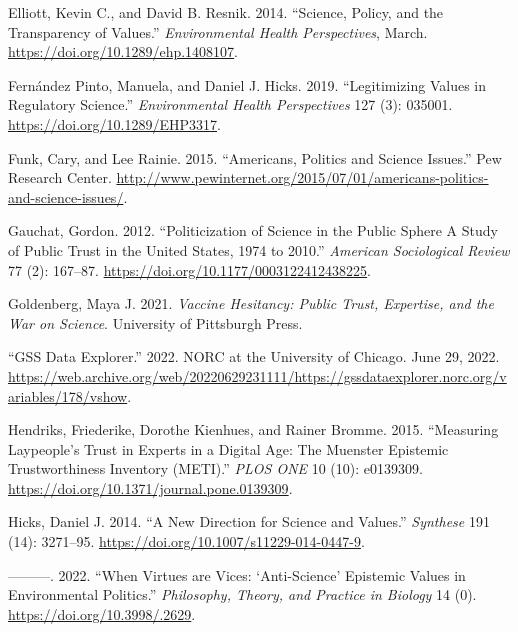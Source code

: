 \documentclass[
  letterpaper,
  DIV=11,
  numbers=noendperiod]{scrartcl}
\newlength{\cslhangindent}
\newlength{\cslentryspacingunit} %
\newenvironment{CSLReferences}[2] %
 {%
  \setlength{\parindent}{0pt}
  \ifodd #1
  \let\oldpar\par
  \def\par{\hangindent=\cslhangindent\oldpar}
  \fi
  \setlength{\parskip}{#2\cslentryspacingunit}
 }%
 {}
\begin{document}
\begin{CSLReferences}{1}{0}
\leavevmode{}%
Elliott, Kevin C., and David B. Resnik. 2014. {``Science, Policy, and
the Transparency of Values.''} \emph{Environmental Health Perspectives},
March. \url{https://doi.org/10.1289/ehp.1408107}.

\leavevmode{}%
Fernández Pinto, Manuela, and Daniel J. Hicks. 2019. {``Legitimizing
Values in Regulatory Science.''} \emph{Environmental Health
Perspectives} 127 (3): 035001. \url{https://doi.org/10.1289/EHP3317}.

\leavevmode{}%
Funk, Cary, and Lee Rainie. 2015. {``Americans, Politics and Science
Issues.''} Pew Research Center.
\url{http://www.pewinternet.org/2015/07/01/americans-politics-and-science-issues/}.

\leavevmode{}%
Gauchat, Gordon. 2012. {``Politicization of Science in the Public Sphere
A Study of Public Trust in the United States, 1974 to 2010.''}
\emph{American Sociological Review} 77 (2): 167--87.
\url{https://doi.org/10.1177/0003122412438225}.

\leavevmode{}%
Goldenberg, Maya J. 2021. \emph{Vaccine Hesitancy: Public Trust,
Expertise, and the War on Science}. University of Pittsburgh Press.

\leavevmode{}%
{``GSS Data Explorer.''} 2022. NORC at the University of Chicago. June
29, 2022.
\url{https://web.archive.org/web/20220629231111/https://gssdataexplorer.norc.org/variables/178/vshow}.

\leavevmode{}%
Hendriks, Friederike, Dorothe Kienhues, and Rainer Bromme. 2015.
{``Measuring Laypeople's Trust in Experts in a Digital Age: The Muenster
Epistemic Trustworthiness Inventory (METI).''} \emph{PLOS ONE} 10 (10):
e0139309. \url{https://doi.org/10.1371/journal.pone.0139309}.

\leavevmode{}%
Hicks, Daniel J. 2014. {``A New Direction for Science and Values.''}
\emph{Synthese} 191 (14): 3271--95.
\url{https://doi.org/10.1007/s11229-014-0447-9}.

\leavevmode{}%
---------. 2022. {``When Virtues are Vices: {`Anti-Science'} Epistemic
Values in Environmental Politics.''} \emph{Philosophy, Theory, and
Practice in Biology} 14 (0). \url{https://doi.org/10.3998/.2629}.


\end{CSLReferences}
\end{document}
